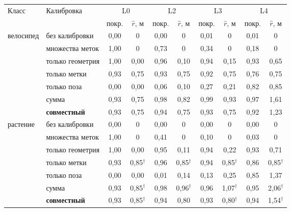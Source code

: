 \begin{tabular}{llcccccccc}
\toprule
Класс & Калибровка & \multicolumn{2}{c}{L0} & \multicolumn{2}{c}{L2} & \multicolumn{2}{c}{L3} & \multicolumn{2}{c}{L4} \\
 & & покр. & $\hat r$, м & покр. & $\hat r$, м & покр. & $\hat r$, м & покр. & $\hat r$, м \\
\midrule
велосипед & без калибровки & 0{,}00 & 0 & 0{,}00 & 0 & 0{,}01 & 0 & 0{,}01 & 0 \\
 & множества меток & 1{,}00 & 0 & 0{,}73 & 0 & 0{,}34 & 0 & 0{,}18 & 0 \\
 & только геометрия & 1{,}00 & 0{,}00 & 0{,}96 & 0{,}10 & 0{,}94 & 0{,}15 & 0{,}93 & 0{,}65 \\
 & только метки & 0{,}93 & 0{,}75 & 0{,}93 & 0{,}75 & 0{,}92 & 0{,}75 & 0{,}76 & 0{,}75 \\
 & только поза & 0{,}00 & 0{,}00 & 0{,}06 & 0{,}10 & 0{,}27 & 0{,}21 & 0{,}82 & 0{,}85 \\
 & сумма & 0{,}93 & 0{,}75 & 0{,}98 & 0{,}82 & 0{,}99 & 0{,}93 & 0{,}97 & 1{,}61 \\
 & \textbf{совместный} & 0{,}93 & 0{,}75 & 0{,}94 & 0{,}75 & 0{,}93 & 0{,}75 & 0{,}92 & 1{,}23 \\
\midrule
растение & без калибровки & 0{,}00 & 0 & 0{,}00 & 0 & 0{,}00 & 0 & 0{,}00 & 0 \\
 & множества меток & 1{,}00 & 0 & 0{,}41 & 0 & 0{,}10 & 0 & 0{,}03 & 0 \\
 & только геометрия & 1{,}00 & 0{,}00 & 0{,}95 & 0{,}11 & 0{,}94 & 0{,}22 & 0{,}93 & 0{,}71 \\
 & только метки & 0{,}93 & 0{,}85$^\dagger$ & 0{,}96 & 0{,}85$^\dagger$ & 0{,}94 & 0{,}85$^\dagger$ & 0{,}86 & 0{,}85$^\dagger$ \\
 & только поза & 0{,}00 & 0{,}00 & 0{,}01 & 0{,}14 & 0{,}13 & 0{,}25 & 0{,}85 & 1{,}37 \\
 & сумма & 0{,}93 & 0{,}85$^\dagger$ & 0{,}98 & 0{,}96$^\dagger$ & 0{,}96 & 1{,}07$^\dagger$ & 0{,}95 & 2{,}06$^\dagger$ \\
 & \textbf{совместный} & 0{,}93 & 0{,}85$^\dagger$ & 0{,}94 & 0{,}80 & 0{,}93 & 0{,}80$^\dagger$ & 0{,}94 & 1{,}54$^\dagger$ \\
\bottomrule
\end{tabular}
